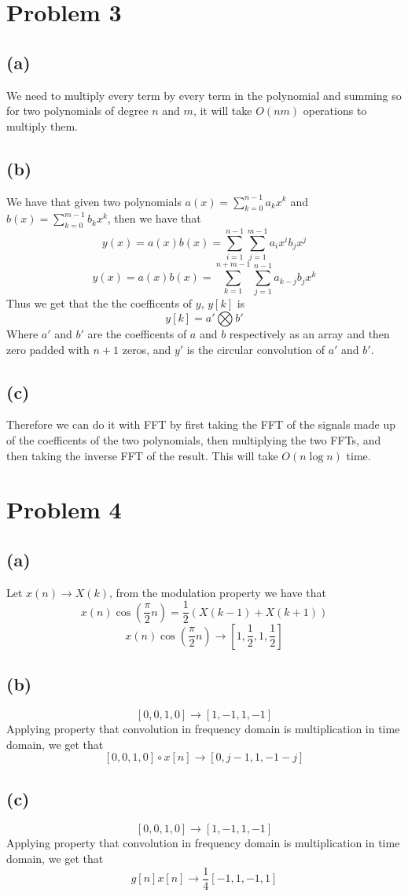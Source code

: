 \section*{Problem 3}
\subsection*{(a)}
We need to multiply every term by every term in the polynomial and summing 
so for two polynomials of degree $n$ and $m$, it will take 
$O(nm)$ operations to multiply them.
\subsection*{(b)}
We have that given two polynomials $a(x)=\sum_{k=0}^{n-1}a_kx^k$ and
$b(x)=\sum_{k=0}^{m-1}b_kx^k$, then we have that
$$y(x)=a(x)b(x)=\sum_{i=1}^{n-1}\sum_{j=1}^{m-1}a_ix^ib_jx^j$$
$$y(x)=a(x)b(x)=\sum_{k=1}^{n+m-1}\sum_{j=1}^{n-1}a_{k-j}b_jx^k$$
Thus we get that the the coefficents of $y$, $y[k]$ is 
$$y[k]=a'\bigotimes b'$$
Where $a'$ and $b'$ are the coefficents of $a$ and $b$ respectively
as an array and then zero padded with $n+1$ zeros, 
and $y'$ is the circular convolution of $a'$ and $b'$.
\subsection*{(c)}
Therefore we can do it with FFT by first taking the FFT
of the signals made up of the coefficents of the two polynomials, 
then multiplying the two FFTs, and then taking the inverse FFT of the
result. This will take $O(n\log n)$ time.
\section*{Problem 4}
\subsection*{(a)}
Let 
$x(n)\to X(k)$, 
from the modulation property we have that
$$x(n)\cos(\frac{\pi}{2}n)=\frac{1}{2}\left(X(k-1)+X(k+1)\right)$$
$$x(n)\cos(\frac{\pi}{2}n)\to [1,\frac{1}{2},1,\frac{1}{2}]$$
\subsection*{(b)}
$$[0,0,1,0]\to[1,-1,1,-1]$$
Applying property that convolution in frequency domain is multiplication in time domain, we get that
$$[0,0,1,0]\circ x[n]\to [0,j-1,1,-1-j]$$
\subsection*{(c)}
$$[0,0,1,0]\to[1,-1,1,-1]$$
Applying property that convolution in frequency domain is multiplication in time domain, we get that
$$g[n]x[n]\to \frac{1}{4}[-1,1,-1,1]$$

